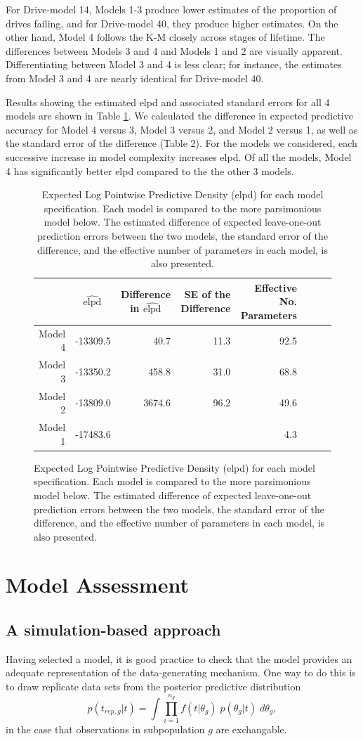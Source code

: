 \documentclass[12pt]{article}
\begin{document}
For Drive-model 14, Models 1-3 produce lower estimates of the proportion of drives failing, and for Drive-model 40, they produce higher estimates.  On the other hand, Model 4 follows the K-M closely across stages of lifetime.  The differences between Models 3 and 4 and Models 1 and 2 are visually apparent.  Differentiating between Model 3 and 4 is less clear; for instance, the estimates from Model 3 and 4 are nearly identical for Drive-model 40.


Results showing the estimated elpd and associated standard errors for all 4 models are shown in Table \ref{table:2}.
We calculated the difference in expected predictive accuracy for Model 4 versus 3, Model 3 versus 2, and Model 2 versus 1, as well as the standard error of the difference (Table 2). For the models we considered, each successive increase in model complexity increases elpd.  Of all the models, Model 4 has significantly better elpd compared to the the other 3 models.

\begin{figure}
\begin{table}[H]
\centering
\begin{tabular}{rrrrrrrr}
  \hline
 & $\widehat{\text{elpd}}$ \ & Difference in $\widehat{\text{elpd}}$ \ & SE of the Difference & Effective No. Parameters\\ 
  \hline
Model 4 & -13309.5 & 40.7 & 11.3 & 92.5 \\ 
Model 3 & -13350.2 & 458.8 & 31.0 & 68.8 \\ 
Model 2 & -13809.0 & 3674.6 & 96.2 & 49.6 \\ 
Model 1 & -17483.6 &  &  & 4.3 \\
   \hline
\end{tabular}
\caption{Expected Log Pointwise Predictive Density (elpd) for each model specification.  Each model is compared to the more parsimonious model below.  The estimated difference of expected leave-one-out prediction errors between the two models, the standard error of the difference, and the effective number of parameters in each model, is also presented.}
\label{table:2}
\end{table}
\end{figure}

\section{Model Assessment}
\subsection{A simulation-based approach}
\label{model-assessment}
Having selected a model, it is good practice to check that the model provides an adequate representation of the data-generating mechanism. One way to do this is to draw replicate data sets from the posterior predictive distribution
$$p(t_{rep,g}|t) = \int \prod_{i=1}^{n_g} f(t|\theta_g)\; p(\theta_g|t)\;d\theta_g,$$
in the case that observations in subpopulation $g$ are exchangable.
\end{document}
